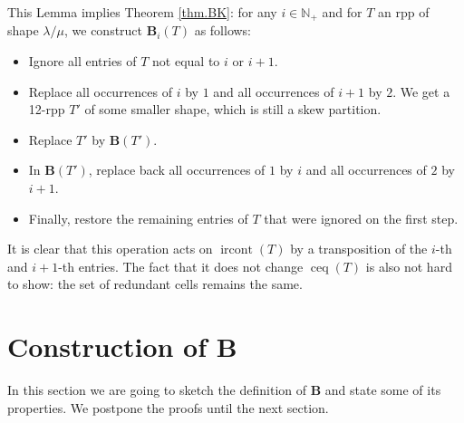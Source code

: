 \documentclass[numbers=enddot,12pt,final,onecolumn,notitlepage]{scrartcl}%
\theoremstyle{definition}
\newcommand{\Nplus}{\mathbb{N}_{+}}
\def\ceq{{\operatorname{ceq}}}
\def\ircont{{\operatorname{ircont}}}
\def\lm{{\lambda/\mu}}
\def\B{{\mathbf{B}}}
\begin{document}
 This Lemma implies Theorem \ref{thm.BK}: for any $i\in\Nplus$ and for $T$ an rpp of shape $\lm$, we construct $\B_i(T)$ as follows: 
 \begin{itemize}
  \item Ignore all entries of $T$ not equal to $i$ or $i+1$. 
  \item Replace all occurrences of $i$ by $1$ and all occurrences of $i+1$ by $2$. We get a 12-rpp $T'$ of some smaller shape, which is still a skew partition.
  \item Replace $T'$ by $\B(T')$.
  \item In $\B(T')$, replace back all occurrences of $1$ by $i$ and all occurrences of $2$ by $i+1$.
  \item Finally, restore the remaining entries of $T$ that were ignored on the first step.
 \end{itemize}
 
 It is clear that this operation acts on $\ircont(T)$ by a transposition of the $i$-th and $i+1$-th entries. The fact that it does not change $\ceq(T)$ is also not hard to show: the set of redundant cells remains the same.

\def\B{{\mathbf{B}}}

\section{Construction of $\mathbf{B}$\label{sect.construction}}

In this section we are going to sketch the definition of $\mathbf{B}$ and state some of its properties. We postpone the proofs until the next section.
\end{document}
